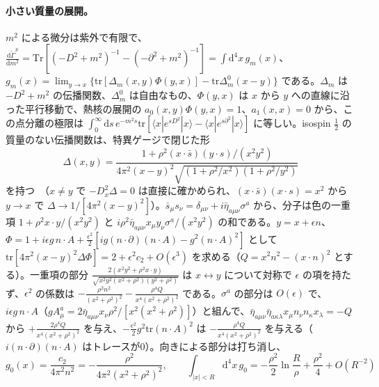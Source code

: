\documentclass[a4paper,10pt]{ltjsarticle}
\newcommand{\dd}{\mathrm{d}}
\newcommand{\tr}{\mathrm{tr}}
\begin{document}
\paragraph{小さい質量の展開。}$m^2$ による微分は紫外で有限で、$\frac{\dd\tilde\Gamma^S}{\dd m^2}=\mathrm{Tr}[(-D^2+m^2)^{-1}-(-\partial^2+m^2)^{-1}]=\int\dd^4x\,g_m(x)$、$g_m(x)=\lim_{y\to x}\{\tr[\Delta_m(x,y)\Phi(y,x)]-\tr\Delta^0_m(x-y)\}$ である。$\Delta_m$ は $-D^2+m^2$ の伝播関数、$\Delta^0_m$ は自由なもの、$\Phi(y,x)$ は $x$ から $y$ への直線に沿った平行移動で、熱核の展開の $a_0(x,y)\Phi(y,x)=1$、$a_1(x,x)=0$ から、この点分離の極限は $\int_0^\infty\dd s\,e^{-m^2s}\tr[\langle x|e^{sD^2}|x\rangle-\langle x|e^{s\partial^2}|x\rangle]$ に等しい。isospin $\frac12$ の質量のない伝播関数は、特異ゲージで閉じた形
\begin{equation*}
\Delta(x,y)=\frac{1+\rho^2(x\cdot\bar s)(y\cdot s)/(x^2y^2)}{4\pi^2(x-y)^2\sqrt{(1+\rho^2/x^2)(1+\rho^2/y^2)}}
\end{equation*}
を持つ~\cite{bccl78}（$x\neq y$ で $-D_x^2\Delta=0$ は直接に確かめられ、$(x\cdot\bar s)(x\cdot s)=x^2$ から $y\to x$ で $\Delta\to1/[4\pi^2(x-y)^2]$）。$\bar s_\mu s_\nu=\delta_{\mu\nu}+i\bar\eta_{a\mu\nu}\sigma^a$ から、分子は色の一重項 $1+\rho^2x\cdot y/(x^2y^2)$ と $i\rho^2\bar\eta_{a\mu\nu}x_\mu y_\nu\sigma^a/(x^2y^2)$ の和である。$y=x+\epsilon n$、$\Phi=1+i\epsilon g\,n\cdot A+\frac{\epsilon^2}2[ig(n\cdot\partial)(n\cdot A)-g^2(n\cdot A)^2]$ として $\tr[4\pi^2(x-y)^2\Delta\Phi]=2+\epsilon^2c_2+O(\epsilon^3)$ を求める（$Q=x^2n^2-(x\cdot n)^2$ とする）。一重項の部分 $\frac{2(x^2y^2+\rho^2x\cdot y)}{\sqrt{x^2y^2(x^2+\rho^2)(y^2+\rho^2)}}$ は $x\leftrightarrow y$ について対称で $\epsilon$ の項を持たず、$\epsilon^2$ の係数は $-\frac{\rho^2n^2}{(x^2+\rho^2)^2}-\frac{\rho^4Q}{x^4(x^2+\rho^2)^2}$ である。$\sigma^a$ の部分は $O(\epsilon)$ で、$i\epsilon g\,n\cdot A$（$gA^a_\mu=2\bar\eta_{a\mu\nu}x_\nu\rho^2/[x^2(x^2+\rho^2)]$）と組んで、$\bar\eta_{a\mu\nu}\bar\eta_{a\kappa\lambda}x_\mu n_\nu n_\kappa x_\lambda=-Q$ から $+\frac{2\rho^4Q}{x^4(x^2+\rho^2)^2}$ を与え、$-\frac{\epsilon^2}2g^2\tr(n\cdot A)^2$ は $-\frac{\rho^4Q}{x^4(x^2+\rho^2)^2}$ を与える（$i(n\cdot\partial)(n\cdot A)$ はトレースが0）。向きによる部分は打ち消し、
\begin{equation*}
g_0(x)=\frac{c_2}{4\pi^2n^2}=-\frac{\rho^2}{4\pi^2(x^2+\rho^2)^2},\qquad \int_{|x|<R}\dd^4x\,g_0=-\frac{\rho^2}2\ln\frac R\rho+\frac{\rho^2}4+O(R^{-2})
\end{equation*}
\end{document}
